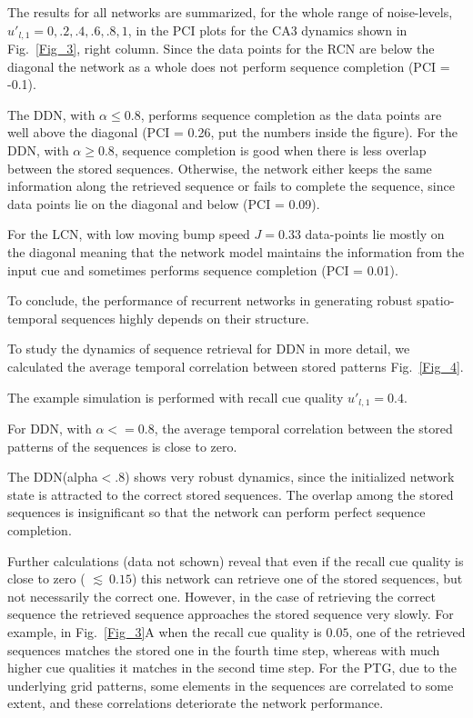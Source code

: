 \documentclass[utf8]{frontiersSCNS} %
\begin{document}
The results for all networks are summarized, for the whole range of noise-levels, $u'_{l, 1} = 0, .2, .4, .6, .8, 1$, in the PCI plots for the CA3 dynamics shown in Fig.~\ref{Fig_3}, right column. Since the data points for the RCN are below the diagonal the network as a whole does not perform sequence completion (PCI = -0.1). 

The DDN, with $\alpha \leq 0.8 $, performs sequence completion as the data points are well above the diagonal (PCI = 0.26, put the numbers inside the figure). For the DDN, with $\alpha \geq 0.8$, sequence completion is good when there is less overlap between the stored sequences. Otherwise, the network either keeps the same information along the retrieved sequence or fails to complete the sequence, since data points lie on the diagonal and below (PCI = 0.09).  

For the LCN, with low moving bump speed $J = 0.33$ data-points lie mostly on the diagonal meaning that the network model maintains the information from the input cue and sometimes performs sequence completion (PCI = 0.01). 

To conclude, the performance of recurrent networks in generating robust spatio-temporal sequences highly depends on their structure.

To study the dynamics of sequence retrieval for DDN in more detail, we calculated the average temporal correlation between stored patterns Fig.~\ref{Fig_4}.   


The example simulation is performed with recall cue quality $u'_{l, 1} = 0.4$. 

For DDN, with $\alpha <= 0.8$, the average temporal correlation between the stored patterns of the sequences is close to zero. 

The DDN(alpha$<.8$) shows very robust dynamics, since the initialized network state is attracted to the correct stored sequences. The overlap among the stored sequences is insignificant so that the network can perform perfect sequence completion.

Further calculations (data not schown) reveal that even if the recall cue quality is close to zero ( $\lesssim \: 0.15$) this network can retrieve one of the stored sequences, but not necessarily the correct one. However, in the case of retrieving the correct sequence the retrieved sequence approaches the stored sequence very slowly. For example, in Fig.~\ref{Fig_3}A when the recall cue quality is $0.05$, one of the retrieved sequences matches the stored one in the fourth time step, whereas with much higher cue qualities it matches in the second time step.    
%
For the PTG, due to the underlying grid patterns, some elements in the sequences are correlated to some extent, and these correlations deteriorate the network performance.
\end{document}
